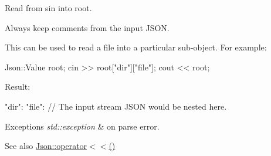 Read from \textquotesingle{}sin\textquotesingle{} into \textquotesingle{}root\textquotesingle{}. 

Always keep comments from the input J\+S\+ON.

This can be used to read a file into a particular sub-\/object. For example\+: 
\begin{DoxyCode}
Json::Value root;
cin >> root[\textcolor{stringliteral}{"dir"}][\textcolor{stringliteral}{"file"}];
cout << root;
\end{DoxyCode}
 Result\+: \begin{DoxyVerb}{
"dir": {
    "file": {
    // The input stream JSON would be nested here.
    }
}
}
\end{DoxyVerb}
 
\begin{DoxyExceptions}{Exceptions}
{\em std\+::exception} & on parse error. \\
\hline
\end{DoxyExceptions}
\begin{DoxySeeAlso}{See also}
\hyperlink{namespace_json_a87bc83d7e90fc666d28aa16727deda2f}{Json\+::operator$<$$<$()} 
\end{DoxySeeAlso}
